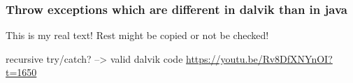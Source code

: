\subsubsection{Throw exceptions which are different in dalvik than in java} \label{subsubsection:counter-reengineering-break-exception}
This is my real text! Rest might be copied or not be checked!


recursive try/catch? --> valid dalvik code\newline
\url{https://youtu.be/Rv8DfXNYnOI?t=1650}
